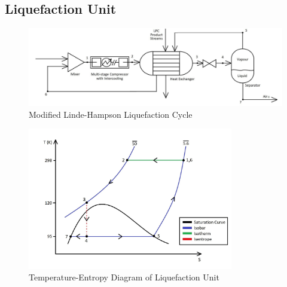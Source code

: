     \newpage
    
    \subsection{Liquefaction Unit}
    \begin{figure}[ht]
        \centering
        \includegraphics[width=1.1\textwidth]{airseparation/handouts/graphics/labelled_liquefier_diagram.jpg}
        \caption{Modified Linde-Hampson Liquefaction Cycle}
        \label{fig:liquefier}
    \end{figure}
    \begin{figure}[ht]
        \centering
        \includegraphics[width=0.8\textwidth]{airseparation/handouts/graphics/liquefier_T-S_diagram.jpg}
        \caption{Temperature-Entropy Diagram of Liquefaction Unit}
        \label{fig:TS_liquefier}
    \end{figure}
    
    \newpage
    
